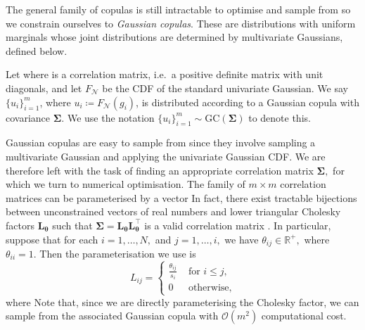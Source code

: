 The general family of copulas is still intractable to optimise and sample from so we constrain ourselves to \emph{Gaussian copulas}.
These are distributions with uniform marginals whose joint distributions are determined by multivariate Gaussians, defined below.

\begin{definition}
    Let  where  is a correlation matrix, i.e.~a positive definite matrix with unit diagonals, and let $F_{\mathcal{N}}$ be the CDF of the standard univariate Gaussian.
    We say $\{u_i\}_{i = 1}^m$, where $u_i \coloneqq F_\mathcal{N}(g_i)$, is distributed according to a Gaussian copula with covariance $\boldsymbol{\Sigma}$. We use the notation $\{u_i\}_{i = 1}^m \sim \text{GC}(\boldsymbol{\Sigma})$ to denote this.
\end{definition}

Gaussian copulas are easy to sample from since they involve sampling a multivariate Gaussian and applying the univariate Gaussian CDF.
We are therefore left with the task of finding an appropriate correlation matrix $\boldsymbol{\Sigma},$ for which we turn to numerical optimisation.
The family of $m \times m$ correlation matrices can be parameterised by a vector 
In fact, there exist tractable bijections between unconstrained vectors of real numbers  and lower triangular Cholesky factors $\mathbf{L}_{\boldsymbol{\theta}}$ such that $\boldsymbol{\Sigma} = \mathbf{L}_{\boldsymbol{\theta}}\mathbf{L}_{\boldsymbol{\theta}}^\top$ is a valid correlation matrix \citep{bhat2021almost}. 
In particular, suppose that for each $i = 1, \dots, N,$ and $j = 1, \dots, i,$ we have $\theta_{ij} \in \mathbb{R}^+,$ where $\theta_{ii} = 1.$
Then the parameterisation we use is
\begin{equation}
L_{ij} = \begin{cases}
\frac{\theta_{ij}}{s_i} & \text{ for } i \leq j, \\
0 & \text{ otherwise},
\end{cases}
\end{equation}
where 
Note that, since we are directly parameterising the Cholesky factor, we can sample from the associated Gaussian copula with $\mathcal{O}(m^2)$ computational cost.

